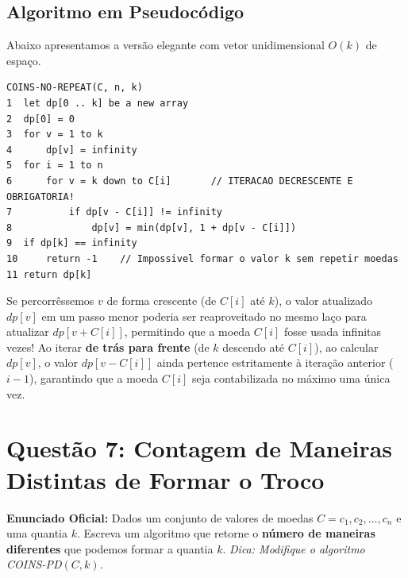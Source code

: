 \documentclass[11pt,a4paper]{article}
\begin{document}
\subsection*{Algoritmo em Pseudocódigo}

Abaixo apresentamos a versão elegante com vetor unidimensional $O(k)$ de espaço.

\begin{lstlisting}[caption={Algoritmo do Troco sem Repetição (0/1)}]
COINS-NO-REPEAT(C, n, k)
1  let dp[0 .. k] be a new array
2  dp[0] = 0
3  for v = 1 to k
4      dp[v] = infinity
5  for i = 1 to n
6      for v = k down to C[i]       // ITERACAO DECRESCENTE E OBRIGATORIA!
7          if dp[v - C[i]] != infinity
8              dp[v] = min(dp[v], 1 + dp[v - C[i]])
9  if dp[k] == infinity
10     return -1    // Impossivel formar o valor k sem repetir moedas
11 return dp[k]
\end{lstlisting}

\begin{alerta}
Se percorrêssemos $v$ de forma crescente (de $C[i]$ até $k$), o valor atualizado $dp[v]$ em um passo menor poderia ser reaproveitado no mesmo laço para atualizar $dp[v + C[i]]$, permitindo que a moeda $C[i]$ fosse usada infinitas vezes! Ao iterar \textbf{de trás para frente} (de $k$ descendo até $C[i]$), ao calcular $dp[v]$, o valor $dp[v - C[i]]$ ainda pertence estritamente à iteração anterior ($i-1$), garantindo que a moeda $C[i]$ seja contabilizada no máximo uma única vez.
\end{alerta}

\vspace{0.4cm}

\section*{Questão 7: Contagem de Maneiras Distintas de Formar o Troco}

\textbf{Enunciado Oficial:} Dados um conjunto de valores de moedas $C = c_1, c_2, \dots, c_n$ e uma quantia $k$. Escreva um algoritmo que retorne o \textbf{número de maneiras diferentes} que podemos formar a quantia $k$. \emph{Dica: Modifique o algoritmo \textsc{COINS-PD}$(C, k)$.}
\end{document}
